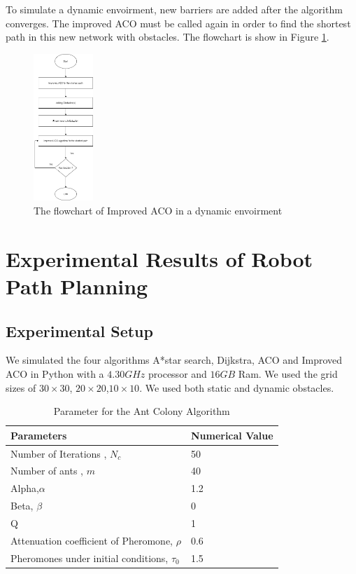 \documentclass[conference]{IEEEtran}
\begin{document}
To simulate a dynamic envoirment, new barriers are added after the algorithm converges. The improved ACO must be called again in order to find the shortest path in this new network with obstacles. The flowchart is show in Figure \ref{fig5}.
\begin{figure}[H]
    \centering
    \includegraphics[width=0.2\textwidth]{RobotPathPlanning.png}
    \caption{The flowchart of Improved ACO in a dynamic envoirment}
    \label{fig5}
\end{figure}
\section{Experimental Results of Robot Path Planning}
\subsection{Experimental Setup}
We simulated the four algorithms A*star search, Dijkstra, ACO and Improved ACO in Python with a $4.30 GHz$ processor and $16GB$ Ram. We used the grid sizes of $30 \times 30$, $20 \times 20$,$10 \times10$. We used both static and dynamic obstacles.
\begin{table}[htbp]
\caption{Parameter for the Ant Colony Algorithm}
\begin{center}
\begin{tabular}{|l|l|}
\hline
Parameters                             & Numerical Value \\ \hline
Number of Iterations , $N_c$                   & 50             \\ \hline
Number of ants , $m$                   & 40              \\ \hline
Alpha,$\alpha$                & 1.2             \\ \hline
Beta, $\beta$                        & 0               \\ \hline
Q                                      & 1               \\ \hline
Attenuation coefficient of Pheromone, $\rho$ & 0.6             \\ \hline
Pheromones under initial   conditions, $\tau_{0}$   & 1.5             \\ \hline
\end{tabular}
\label{tab1}
\end{center}
\end{table}
\end{document}
